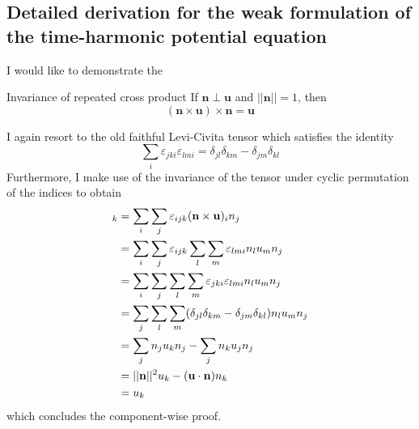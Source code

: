 \documentclass[11pt, a4paper]{article}
\begin{document}
\subsection{Detailed derivation for the weak formulation of the time-harmonic potential equation}
\label{subsec:derivation}

I would like to demonstrate the
\begin{fancybox}{Invariance of repeated cross product}
    If $\mathbf{n} \perp \mathbf{u}$ and $||\mathbf{n}|| = 1$, then
    \begin{equation}
        (\mathbf{n} \times \mathbf{u}) \times \mathbf{n} = \mathbf{u} \label{equ:double-cross-normal}
    \end{equation}
\end{fancybox}

I again resort to the old faithful Levi-Civita tensor which satisfies the
identity
\begin{equation}
    \sum_i \varepsilon_{jki} \varepsilon_{lmi} = \delta_{jl} \delta_{km} - \delta_{jm} \delta_{kl}
\end{equation}
Furthermore, I make use of the invariance of the tensor under cyclic permutation
of the indices to obtain
\begin{align}
    [(\mathbf{n} \times \mathbf{u}) \times \mathbf{n}]_k
    &= \sum_i \sum_j \varepsilon_{ijk} (\mathbf{n} \times \mathbf{u})_i n_j \notag \\ 
    &= \sum_i \sum_j \varepsilon_{ijk} \sum_l \sum_m \varepsilon_{lmi} n_l u_m n_j \notag \\ 
    &= \sum_i \sum_j \sum_l \sum_m \varepsilon_{jki} \varepsilon_{lmi} n_l u_m n_j \notag \\ 
    &= \sum_j \sum_l \sum_m (\delta_{jl} \delta_{km} - \delta_{jm} \delta_{kl}) n_l u_m n_j \notag \\
    &= \sum_j n_j u_k n_j - \sum_j n_k u_j n_j \notag \\
    &= ||\mathbf{n}||^2 u_k - (\mathbf{u} \cdot \mathbf{n}) n_k \notag \\ 
    &= u_k
\end{align}
which concludes the component-wise proof.
\end{document}
